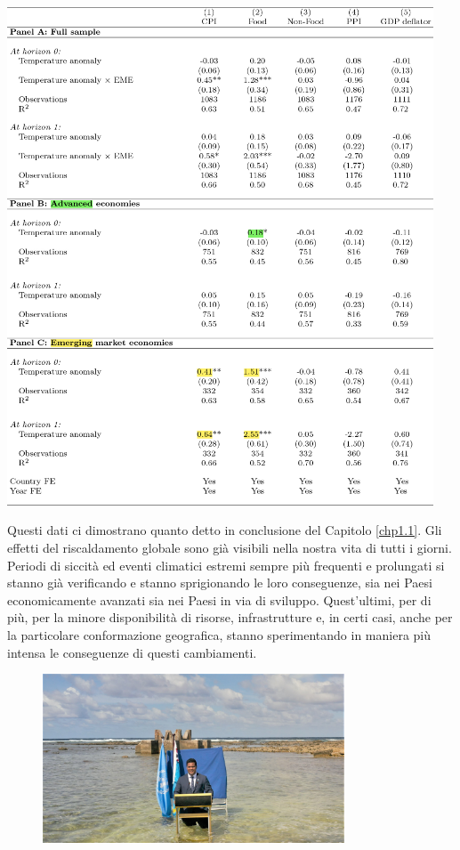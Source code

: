 \begin{table}[t!]
	\centering
	\includegraphics[width=0.95\textwidth]{img/results_seasons_countries_splitted.pdf}
	\caption{}
	\label{table:results_splitted}
\end{table}

Questi dati ci dimostrano quanto detto in conclusione del Capitolo \ref{chp1.1}. Gli effetti del riscaldamento globale sono già visibili nella nostra vita di tutti i giorni. Periodi di siccità ed eventi climatici estremi sempre più frequenti e prolungati si stanno già verificando e stanno sprigionando le loro conseguenze, sia nei Paesi economicamente avanzati sia nei Paesi in via di sviluppo. Quest'ultimi, per di più, per la minore disponibilità di risorse, infrastrutture e, in certi casi, anche per la particolare conformazione geografica, stanno sperimentando in maniera più intensa le conseguenze di questi cambiamenti.

\begin{figure}[h]
	\centering
	\includegraphics[width=0.80\textwidth]{img/tuvalu_water.jpg}
	\caption{}
\end{figure}

